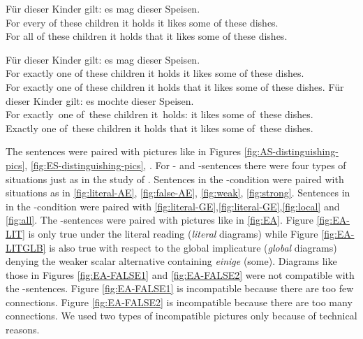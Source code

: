 \documentclass[fleqn,reqno,10pt,draft]{article}
\newcommand{\as}{\acro{as}}
\renewcommand{\es}{\acro{es}}
\newcommand{\ea}{\acro{ea}}
\begin{document}
\begin{exe}
\ex \gll F\"{u}r  dieser Kinder gilt: es
  mag  dieser Speisen. \label{bsp:AS-K1}\\
  For every {of these} children {it holds} it likes some {of
    these} dishes.\\
  For all of these children it holds that it likes some of these dishes.
\end{exe}
\begin{exe}
\ex \gll F\"{u}r   dieser Kinder gilt: es
  mag  dieser Speisen. \label{bsp:ES-K1}\\
  For exactly one {of these} children {it holds} it likes some {of
    these} dishes.\\
  For exactly one of these children it holds that it likes some of these dishes.
\ex \gll F{\"u}r  dieser Kinder gilt: es mochte  dieser Speisen.  \label{bsp:EA-K1}\\
For exactly\ one of\ these children it\ holds: it likes some of\ these dishes.\\
Exactly one of\ these children it holds that it likes some of\ these dishes.\\
\end{exe}

The sentences were paired with pictures like in Figures \ref{fig:AS-distinguishing-pics}, \ref{fig:ES-distinguishing-pics}, \label{fig:EA}. For \es- and \as-sentences  there were four types of situations just as in  the study of \citet{ChemlaSpector2010:Experimental-Ev}. Sentences in the \as-condition were paired with situations as in \ref{fig:literal-AE}, \ref{fig:false-AE}, \ref{fig:weak}, \ref{fig:strong}. Sentences in in the \es-condition were paired with \ref{fig:literal-GE},\ref{fig:literal-GE},\ref{fig:local} and \ref{fig:all}. The \ea-sentences were paired with pictures like in \ref{fig:EA}. Figure \ref{fig:EA-LIT} is only true under the literal reading ({\it literal} diagrams) while  Figure \ref{fig:EA-LITGLB} is also true with respect to the global implicature ({\it global} diagrams) denying the weaker scalar alternative containing {\it einige} (some). Diagrams like those in Figures \ref{fig:EA-FALSE1} and \ref{fig:EA-FALSE2} were not compatible with the \ea-sentences. Figure \ref{fig:EA-FALSE1} is incompatible because there are too few connections. Figure \ref{fig:EA-FALSE2} is incompatible because there are too many connections. We used two types of incompatible pictures only because of technical reasons.
\end{document}

